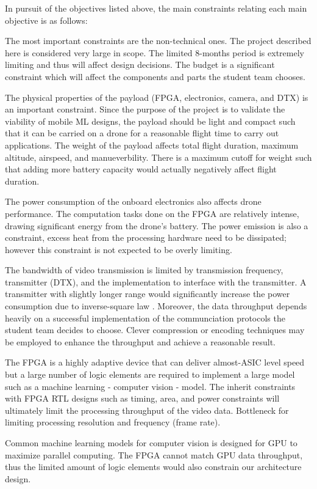 In pursuit of the objectives listed above, the main constraints relating 
each main objective is as follows:

The most important constraints are the non-technical ones. The project described
here is considered very large in scope. The limited 8-months period is extremely
limiting and thus will affect design decisions. The budget is a significant
constraint which will affect the components and parts the student team chooses.

The physical properties of the payload (FPGA, electronics, camera, and  DTX) is an important constraint. Since the purpose of the project
is to validate the viability of mobile ML designs, the payload should be light and compact such
that it can be carried on a drone for a reasonable flight time to carry
out applications. The weight of the payload affects total flight duration, maximum altitude, airspeed, and manueverbility. 
There is a maximum cutoff for weight such that adding more battery capacity would actually negatively affect flight duration.

The power consumption of the onboard electronics also affects drone performance.
The computation tasks done on the FPGA are relatively intense, drawing significant energy from the drone's battery. 
The power emission is also a constraint, excess heat from the processing
hardware need to be dissipated; however this constraint is not expected to be overly limiting.

The bandwidth of video transmission is limited by transmission frequency, transmitter (DTX), and
the implementation to interface with the transmitter. A transmitter with slightly longer range would
significantly increase the power consumption due to inverse-square law \cite{wiki-inverse-square}.
Moreover, the data throughput depends heavily on a successful implementation of the communciation
protocols the student team decides to choose. Clever compression or encoding techniques may be
employed to enhance the throughput and achieve a reasonable result.

The FPGA is a highly adaptive device that can deliver almost-ASIC level speed
but a large number of logic elements are required to implement a large model 
such as a machine learning - computer vision - model. The inherit constraints
with FPGA RTL designs such as timing, area, and power constraints will ultimately
limit the processing throughput of the video data. Bottleneck for limiting
processing resolution and frequency (frame rate).

Common machine learning models for computer vision is designed for GPU to
maximize parallel computing. The FPGA cannot match GPU data throughput, thus
the limited amount of logic elements would also constrain our architecture
design.
